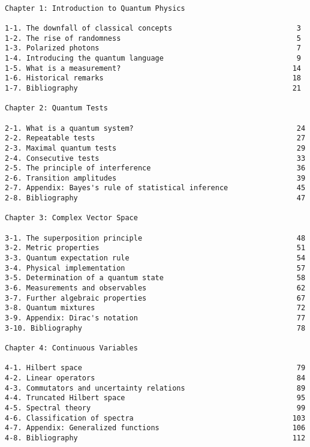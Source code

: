 \begin{verbatim}

Chapter 1: Introduction to Quantum Physics 
 
1-1. The downfall of classical concepts                             3 
1-2. The rise of randomness                                         5 
1-3. Polarized photons                                              7 
1-4. Introducing the quantum language                               9 
1-5. What is a measurement?                                        14 
1-6. Historical remarks                                            18 
1-7. Bibliography                                                  21
 
Chapter 2: Quantum Tests 
 
2-1. What is a quantum system?                                      24 
2-2. Repeatable tests                                               27 
2-3. Maximal quantum tests                                          29 
2-4. Consecutive tests                                              33 
2-5. The principle of interference                                  36 
2-6. Transition amplitudes                                          39 
2-7. Appendix: Bayes's rule of statistical inference                45 
2-8. Bibliography                                                   47
 
Chapter 3: Complex Vector Space 
 
3-1. The superposition principle                                    48 
3-2. Metric properties                                              51 
3-3. Quantum expectation rule                                       54 
3-4. Physical implementation                                        57 
3-5. Determination of a quantum state                               58 
3-6. Measurements and observables                                   62 
3-7. Further algebraic properties                                   67 
3-8. Quantum mixtures                                               72 
3-9. Appendix: Dirac's notation                                     77 
3-10. Bibliography                                                  78
     
Chapter 4: Continuous Variables 
 
4-1. Hilbert space                                                  79 
4-2. Linear operators                                               84 
4-3. Commutators and uncertainty relations                          89 
4-4. Truncated Hilbert space                                        95 
4-5. Spectral theory                                                99 
4-6. Classification of spectra                                     103 
4-7. Appendix: Generalized functions                               106 
4-8. Bibliography                                                  112
 

\end{verbatim}
